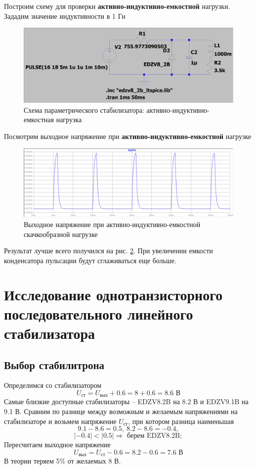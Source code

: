 \documentclass[a4paper, 12pt]{article}
\begin{document}
    \noindent Построим схему для проверки \textbf{активно-индуктивно-емкостной} нагрузки. Зададим
    значение индуктивности в 1 Гн
    \begin{figure}[H]
        \centering
        \includegraphics[scale=0.22]{1task_scheme_ALC.png}
        \captionsetup{skip=0pt}
        \caption{Схема параметрического стабилизатора: активно-индуктивно-емкостная нагрузка}
        \label{fig:1task_scheme_ALC}
    \end{figure}
    \noindent Посмотрим выходное напряжение при \textbf{активно-индуктивно-емкостной} нагрузке
    \begin{figure}[H]
        \centering
        \includegraphics[scale=0.46]{1task_rect_ALC.png}
        \captionsetup{skip=0pt}
        \caption{Выходное напряжение при активно-индуктивно-емкостной скачкообразной нагрузке}
        \label{fig:1task_rect_ALC}
    \end{figure}
    \noindent Результат лучше всего получился на рис. \ref{fig:1task_rect_ALC}. При увеличении
    емкости конденсатора пульсации будут сглаживаться еще больше.


    \section{Исследование однотранзисторного последовательного линейного стабилизатора}
    \subsection{Выбор стабилитрона}
    Определимся со стабилизатором
    $$
    U_{\text{ст}}=U_{\text{вых}}+0.6=8+0.6=8.6\text{ В}
    $$
    Самые близкие доступные стабилизаторы -- EDZV8.2B на 8.2 В и EDZV9.1B на 9.1 В.
    Сравним по разнице между возможным и желаемым напряжениями на стабилизаторе и возьмем
    напряжение $U_{\text{ст}}$, при котором разница наименьшая
    $$
    9.1-8.6=0.5,\ 8.2-8.6=-0.4,
    $$
    $$
    |-0.4|<|0.5|\Rightarrow\text{ берем EDZV8.2B};
    $$
    Пересчитаем выходное напряжение
    $$
    U_{\text{вых}}=U_{\text{ст}}-0.6=8.2-0.6=7.6\text{ В}
    $$
    В теории теряем 5\% от желаемых 8 В.
    
\end{document}
